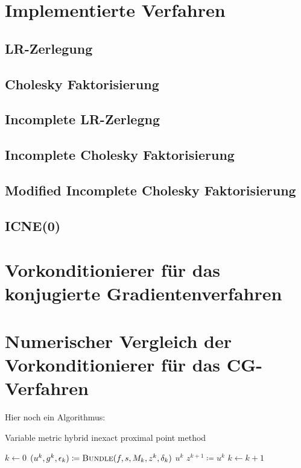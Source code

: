 \newpage

\section{Implementierte Verfahren}



\subsection{LR-Zerlegung}
\subsection{Cholesky Faktorisierung}
\subsection{Incomplete LR-Zerlegng}
\subsection{Incomplete Cholesky Faktorisierung}
\subsection{Modified Incomplete Cholesky Faktorisierung}
\subsection{ICNE(0)}


\section{Vorkonditionierer f\"ur das konjugierte Gradientenverfahren}


\section{Numerischer Vergleich der Vorkonditionierer f\"ur das CG-Verfahren}






Hier noch ein Algorithmus:

\begin{algorithm}[ht]
\caption{Variable metric hybrid inexact proximal point
method}\label{SG_alg:vmhippm}
\begin{algorithmic}[1]
 \State $k \gets 0$
   \State $(u^k, g^k, \epsilon_k) \coloneqq \Call{Bundle}{f, s, M_k,
z^k, \delta_k}$ 
\State \Return $u^k$  \EndIf
   \State $z^{k+1} \coloneqq u^k$ 
   \State $k \gets k + 1$
 \EndWhile
\EndFunction
\end{algorithmic}
\end{algorithm}

